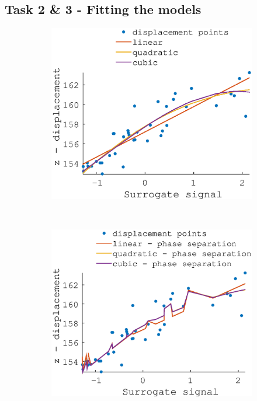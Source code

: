 \documentclass[11pt,a4paper,oneside]{report}
\begin{document}
\subsection*{Task 2 \& 3 - Fitting the models}

\begin{figure}[H]
  \centering
  \hspace*{-2em}
  \begin{subfigure}[b]{0.33\textwidth}
    \includegraphics[width=\textwidth]{figures/task2/fit_round1_couch1.eps}
  \end{subfigure}%
    ~ %
  \begin{subfigure}[b]{0.33\textwidth}
    \includegraphics[width=\textwidth]{figures/task2/fit_round2_couch1.eps}

\end{subfigure}
\end{figure}
\end{document}
